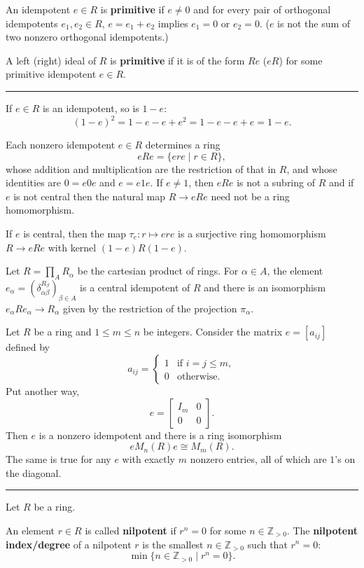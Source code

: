 \documentclass[12pt]{article}
\newcommand{\keyword}[1]{\textbf{#1}}
\newcommand{\sepline}{\rule{\textwidth}{0.4pt}}
\theoremstyle{definition}
\newcommand{\Z}{\mathbb{Z}}
\newcommand{\<}{\left\langle}
\renewcommand{\>}{\right\rangle}
\newcommand{\iso}{\cong}
\newcommand{\mat}[1]{\begin{bmatrix}#1\end{bmatrix}}
\renewcommand{\_}[1]{{_{#1}}}
\begin{document}
An idempotent $e \in R$ is \keyword{primitive} if $e \ne 0$ and for every pair of orthogonal idempotents $e_1, e_2 \in R$, $e = e_1 + e_2$ implies $e_1 = 0$ or $e_2 = 0$.
($e$ is not the sum of two nonzero orthogonal idempotents.)

A left (right) ideal of $R$ is \keyword{primitive} if it is of the form $Re$ ($eR$) for some primitive idempotent $e \in R$.

\sepline

If $e \in R$ is an idempotent, so is $1 - e$:
\[
    (1 - e)^2
        = 1 - e - e + e^2
        = 1 - e - e + e
        = 1 - e.
\]

Each nonzero idempotent $e \in R$ determines a ring
\[
    eRe = \{ere \mid r \in R\},
\]
whose addition and multiplication are the restriction of that in $R$, and whose identities are $0 = e0e$ and $e = e1e$.
If $e \ne 1$, then $eRe$ is not a subring of $R$ and if $e$ is not central then the natural map $R \to eRe$ need not be a ring homomorphism.

If $e$ is central, then the map $\tau_e : r \mapsto ere$ is a surjective ring homomorphism $R \to eRe$ with kernel $(1 - e)R(1 - e)$.

Let $R = \prod_{A} R_\alpha$ be the cartesian product of rings.
For $\alpha \in A$, the element $e_\alpha = (\delta_{\alpha\beta}^{R_\beta})_{\beta \in A}$ is a central idempotent of $R$ and there is an isomorphism $e_\alpha R e_\alpha \to R_\alpha$ given by the restriction of the projection $\pi_\alpha$.

Let $R$ be a ring and $1 \leq m \leq n$ be integers.
Consider the matrix $e = [a_{ij}]$ defined by
\[
    a_{ij} = \begin{cases}
        1 & \text{if } i = j \leq m, \\
        0 & \text{otherwise}.
    \end{cases}
\]
Put another way,
\[
    e = \mat{I_m & 0 \\ 0 & 0}.
\]
Then $e$ is a nonzero idempotent and there is a ring isomorphism
\[
    eM_n(R)e \iso M_m(R).
\]
The same is true for any $e$ with exactly $m$ nonzero entries, all of which are $1$'s on the diagonal.

\sepline

Let $R$ be a ring.

An element $r \in R$ is called \keyword{nilpotent} if $r^n = 0$ for some $n \in \Z_{>0}$.
The \keyword{nilpotent index/degree} of a nilpotent $r$ is the smallest $n \in \Z_{>0}$ such that $r^n = 0$:
\[
    \min\{n \in \Z_{>0} \mid r^n = 0\}.
\]
\end{document}
